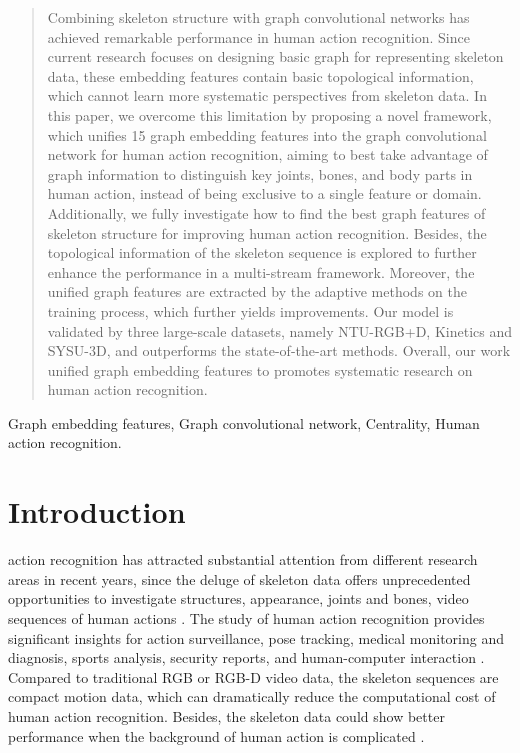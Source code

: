 \documentclass[journal]{IEEEtran}
\begin{document}
\begin{abstract}
Combining skeleton structure with graph convolutional networks has achieved remarkable performance in human action recognition. Since current
research focuses on designing basic graph for representing skeleton data, these embedding features contain basic topological information, which cannot learn more systematic perspectives from skeleton data. In this paper, we overcome this limitation by proposing a novel framework, which unifies 15 graph embedding features into the graph convolutional network for human action recognition, aiming to best take advantage of graph information to distinguish key joints, bones, and body parts in human action, instead of being exclusive to a single feature or domain. Additionally, we fully investigate how to find the best graph features of skeleton structure for improving human action recognition. Besides, the topological information of the skeleton sequence is explored to further enhance the performance in a multi-stream framework. Moreover, the unified graph features are extracted by the adaptive methods on the training process, which further yields improvements. Our model is validated by three large-scale datasets, namely NTU-RGB+D, Kinetics and SYSU-3D, and outperforms the state-of-the-art methods. Overall, our work unified graph embedding features to promotes systematic research on human action recognition.
\end{abstract}

\begin{IEEEkeywords}
Graph embedding features, Graph convolutional network, Centrality, Human action recognition.
\end{IEEEkeywords}






\IEEEpeerreviewmaketitle



\section{Introduction}
 action recognition has attracted substantial attention from different research areas in recent years, since the deluge of skeleton data offers unprecedented opportunities to investigate structures, appearance, joints and bones, video sequences of human actions \cite{yan2018spatial,luo2019tangent,song2017end}. The study of human action recognition provides significant insights for action surveillance, pose tracking, medical monitoring and diagnosis, sports analysis, security reports, and human-computer interaction \cite{li2018action,tu2019action,dhiman2020view}. Compared to traditional RGB or RGB-D video data, the skeleton sequences are compact motion data, which can dramatically reduce the computational cost of human action recognition. Besides, the skeleton data could show better performance when the background of human action is complicated \cite{yan2018spatial,xie2018memory}.
\end{document}
